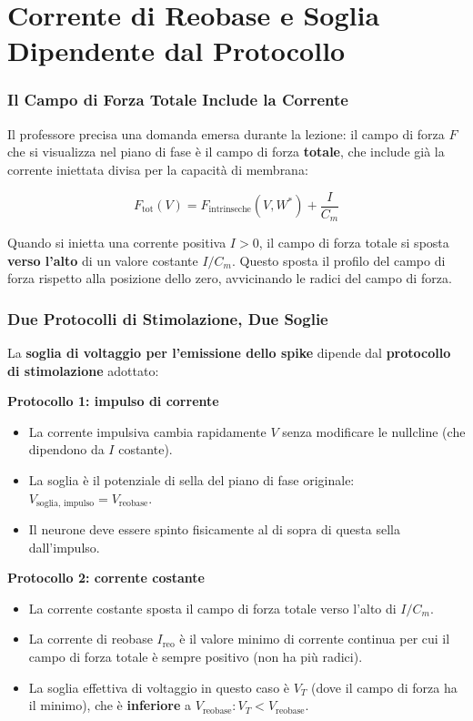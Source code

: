 \section{Corrente di Reobase e Soglia Dipendente dal Protocollo}

\subsubsection{Il Campo di Forza Totale Include la Corrente}

Il professore precisa una domanda emersa durante la lezione: il campo di forza $F$ che si visualizza nel piano di fase è il campo di forza \textbf{totale}, che include già la corrente iniettata divisa per la capacità di membrana:

\begin{equation}
F_{\text{tot}}(V) = F_{\text{intrinseche}}(V, W^*) + \frac{I}{C_m}
\end{equation}

Quando si inietta una corrente positiva $I > 0$, il campo di forza totale si sposta \textbf{verso l'alto} di un valore costante $I/C_m$. Questo sposta il profilo del campo di forza rispetto alla posizione dello zero, avvicinando le radici del campo di forza.

\subsubsection{Due Protocolli di Stimolazione, Due Soglie}

La \textbf{soglia di voltaggio per l'emissione dello spike} dipende dal \textbf{protocollo di stimolazione} adottato:

\textbf{Protocollo 1: impulso di corrente}
\begin{itemize}
    \item La corrente impulsiva cambia rapidamente $V$ senza modificare le nullcline (che dipendono da $I$ costante).
    \item La soglia è il potenziale di sella del piano di fase originale: $V_{\text{soglia, impulso}} = V_{\text{reobase}}$.
    \item Il neurone deve essere spinto fisicamente al di sopra di questa sella dall'impulso.
\end{itemize}

\textbf{Protocollo 2: corrente costante}
\begin{itemize}
    \item La corrente costante sposta il campo di forza totale verso l'alto di $I/C_m$.
    \item La corrente di reobase $I_{\text{reo}}$ è il valore minimo di corrente continua per cui il campo di forza totale è sempre positivo (non ha più radici).
    \item La soglia effettiva di voltaggio in questo caso è $V_T$ (dove il campo di forza ha il minimo), che è \textbf{inferiore} a $V_{\text{reobase}}: V_T < V_{\text{reobase}}$.
\end{itemize}

